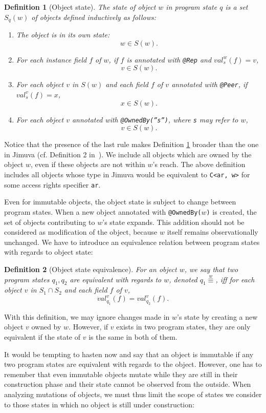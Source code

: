 \documentclass{pracamgr}
\theoremstyle{all}
\newtheorem{defi}{Definition}[chapter]
\begin{document}
\begin{defi}[Object state]
  \label{def:state}
  The \emph{state} of object $w$ in program state $q$ is a set $S_q(w)$
  of objects defined inductively as follows:
  \begin{enumerate}[(1)]
  \item The object is in its own state: 
    $$w \in S(w).$$
  \item For each instance field $f$ of $w$, if $f$ is annotated with
    \texttt{@Rep} and $val_s^w(f) = v$,
    $$v \in S(w).$$
  \item For each object $v$ in $S(w)$ and each field $f$ of $v$
    annotated with \texttt{@Peer}, if $val_s^v(f) = x$, 
    $$ x \in S(w).$$
  \item For each object $v$ annotated with \texttt{@OwnedBy(''s'')},
    where \texttt{s} may refer to $w$,
    $$v \in S(w).$$
  \end{enumerate}
\end{defi}
Notice that the presence of the last rule makes Definition
\ref{def:state} broader than the one in Jimuva (cf. Definition 2
in~\cite{haack}). We include all objects which are owned by the
object $w$, even if these objects are not within $w$'s reach. The
above definition includes all objects whose type in Jimuva would be
equivalent to \texttt{C<ar, w>} for some access rights specifier
\texttt{ar}.

Even for immutable objects, the object state is subject to change
between program states. When a new object annotated with
\texttt{@OwnedBy($w$)} is created, the set of objects contributing
to $w$'s state expands. This addition should not be considered as
modification of the object, because $w$ itself remains observationally
unchanged. We have to introduce an equivalence relation between
program states with regards to object state:
\begin{defi}[Object state equivalence]
  For an object $w$, we say that two program states $q_1, q_2$ are
  \emph{equivalent with regards to $w$}, denoted $q_1
  \stackrel{w}{\equiv}$, iff for each object $v$ in $S_1 \cap S_2$ and
  each field $f$ of $v$,
  $$val_{q_1}^{v}(f) = val_{q_2}^{v}(f).$$
\end{defi}
With this definition, we may ignore changes made in $w$'s state by
creating a new object $v$ owned by $w$. However, if $v$ exists in two
program states, they are only equivalent if the state of $v$ is the
same in both of them.

It would be tempting to hasten now and say that an object is immutable
if any two program states are equivalent with regards to the
object. However, one has to remember that even immutable objects
mutate while they are still in their construction phase and their
state cannot be observed from the outside. When analyzing mutations of
objects, we must thus limit the scope of states we consider to those
states in which no object is still under construction:
\end{document}
